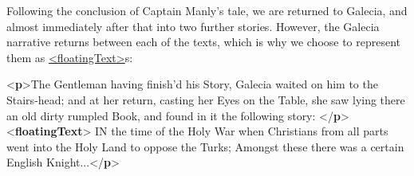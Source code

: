Following the conclusion of Captain Manly's tale, we are returned to Galecia, and almost immediately after that into two further stories.  However, the Galecia narrative returns between each of the texts, which is why we choose to represent them as \hyperref[TEI.floatingText]{<floatingText>}s: \par\bgroup{}\exampleFont \begin{shaded}\noindent\mbox{}{<\textbf{p}>}The Gentleman having finish'd his Story, Galecia waited on him to\mbox{}\newline 
 the Stairs-head; and at her return, casting her Eyes on the Table, she\mbox{}\newline 
 saw lying there an old dirty rumpled Book, and found in it the\mbox{}\newline 
 following story: {</\textbf{p}>}\mbox{}\newline 
{<\textbf{floatingText}>}\mbox{}\newline 
{}\mbox{}\newline 
\hspace*{1em} IN the time of the Holy War when\mbox{}\newline 
\hspace*{1em}\hspace*{1em}\hspace*{1em}\hspace*{1em} Christians from all parts went into the Holy Land to oppose the Turks;\mbox{}\newline 
\hspace*{1em}\hspace*{1em}\hspace*{1em}\hspace*{1em} Amongst these there was a certain English Knight...{</\textbf{p}>}\mbox{}\newline 

\end{shaded}
